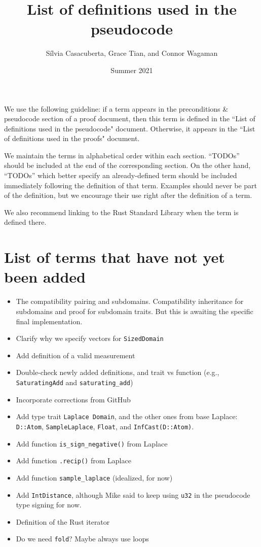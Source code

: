 \documentclass[11pt,a4paper]{article}
\title{List of definitions used in the pseudocode}
\author{S\'ilvia Casacuberta, Grace Tian, and Connor Wagaman}
\date{Summer 2021}
\theoremstyle{definition}
\begin{document}
\maketitle

We use the following guideline: if a term appears in the preconditions \& pseudocode section of a proof document, then this term is defined in the ``List of definitions used in the pseudocode" document. Otherwise, it appears in the ``List of definitions used in the proofs" document. 

We maintain the terms in alphabetical order within each section. ``TODOs'' should be included at the end of the corresponding section. On the other hand, ``TODOs'' which better specify an already-defined term should be included immediately following the definition of that term. Examples should never be part of the definition, but we encourage their use right after the definition of a term.

We also recommend linking to the Rust Standard Library when the term is defined there.

\tableofcontents

\section*{List of terms that have not yet been added}
\begin{itemize}
    \item The compatibility pairing and subdomains. Compatibility inheritance for subdomains and proof for subdomain traits. But this is awaiting the specific final implementation.
    \item Clarify why we specify vectors for \texttt{SizedDomain}
    \item Add definition of a valid measurement
    \item Double-check newly added definitions, and trait vs function (e.g., \texttt{SaturatingAdd} and \texttt{saturating\_add})
    \item Incorporate corrections from GitHub
    \item Add type trait \texttt{Laplace Domain}, and the other ones from base Laplace: \texttt{D::Atom}, \texttt{SampleLaplace}, \texttt{Float}, and \texttt{InfCast(D::Atom)}.
    \item Add function \texttt{is\_sign\_negative()} from Laplace
    \item Add function \texttt{.recip()} from Laplace
    \item Add function \texttt{sample\_laplace} (idealized, for now)
    \item Add \texttt{IntDistance}, although Mike said to keep using \texttt{u32} in the pseudocode type signing for now.
    \item Definition of the Rust iterator
    \item Do we need \texttt{fold}? Maybe always use loops
\end{itemize}
\end{document}
